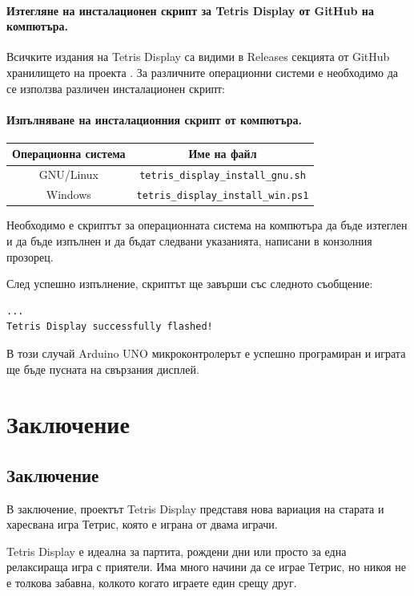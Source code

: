 \documentclass[titlepage, oneside, 12pt]{book}
\newcommand{\ard}{Arduino\texttrademark{}}
\begin{document}
\subsubsection{Изтегляне на инсталационен скрипт за Tetris Display от GitHub на компютъра.}

Всичките издания на Tetris Display са видими в Releases секцията от GitHub хранилището на проекта \cite{github}.
За различните операционни системи е необходимо да се използва различен инсталационен скрипт:

\subsubsection{Изпълняване на инсталационния скрипт от компютъра.}

\begin{center}
  \begin{tabular}{c|c}
    Операционна система & Име на файл \\ 
    \hline
    GNU/Linux & \texttt{tetris_display_install_gnu.sh} \\  
    Windows & \texttt{tetris_display_install_win.ps1} \\  
  \end{tabular}
\end{center}

Необходимо е скриптът за операционната система на компютъра да бъде изтеглен и
да бъде изпълнен и да бъдат следвани указанията, написани в конзолния прозорец.

След успешно изпълнение, скриптът ще завърши със следното съобщение:

\begin{verbatim}
...
Tetris Display successfully flashed!
\end{verbatim}

В този случай \ard{} UNO микроконтролерът е успешно програмиран и играта ще бъде пусната на свързания дисплей.

\chapter{Заключение}

\tableofcontents


\section{Заключение}

В заключение, проектът Tetris Display представя нова вариация на старата и харесвана игра Тетрис,
която е играна от двама играчи.

\textmd{Tetris Display} е идеална за партита, рождени дни или просто за една релаксираща
игра с приятели. Има много начини да се играе \textmd{Тетрис}, но никоя не е толкова
забавна, колкото когато играете един срещу друг.

\printbibliography[heading=bibintoc]
\end{document}
